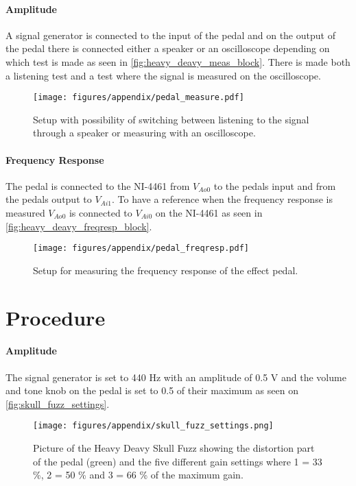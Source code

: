 \paragraph*{Amplitude}

A signal generator is connected to the input of the pedal and on the output of the pedal there is connected either a speaker or an oscilloscope depending on which test is made as seen in \autoref{fig:heavy_deavy_meas_block}. There is made both a listening test and a test where the signal is measured on the oscilloscope.

\begin{figure}[htbp]
	\centering
	\texttt{[image: figures/appendix/pedal\_measure.pdf]}
	\caption{Setup with possibility of switching between listening to the signal through a speaker or measuring with an oscilloscope.}
	\label{fig:heavy_deavy_meas_block}
\end{figure}


\paragraph*{Frequency Response}
The pedal is connected to the NI-4461 from $V_{Ao0}$ to the pedals input and from the pedals output to $V_{Ai1}$. To have a reference when the frequency response is measured $V_{Ao0}$ is connected to $V_{Ai0}$ on the NI-4461 as seen in \autoref{fig:heavy_deavy_freqresp_block}.


\begin{figure}[htbp]
	\centering
	\texttt{[image: figures/appendix/pedal\_freqresp.pdf]}
	\caption{Setup for measuring the frequency response of the effect pedal.}
	\label{fig:heavy_deavy_freqresp_block}
\end{figure}



\section{Procedure}

\paragraph*{Amplitude}

The signal generator is set to 440 Hz with an amplitude of 0.5 V and the volume and tone knob on the pedal is set to 0.5 of their maximum as seen on \autoref{fig:skull_fuzz_settings}.

\begin{figure}[H]
	\centering
	\texttt{[image: figures/appendix/skull\_fuzz\_settings.png]}
	\caption{Picture of the Heavy Deavy Skull Fuzz showing the distortion part of the pedal (green) and the five different gain settings where 1 = 33 \%, 2 = 50 \% and 3 = 66 \% of the maximum gain.}
	\label{fig:skull_fuzz_settings}
\end{figure}

